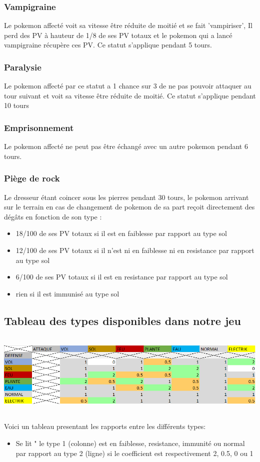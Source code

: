 		\subsubsection{Vampigraine}
            Le pokemon affecté voit sa vitesse être réduite de moitié et se fait 'vampiriser', Il perd des PV à hauteur de 1/8 de ses PV totaux et le pokemon qui a lancé vampigraine récupère ces PV. Ce statut s'applique pendant 5 tours.
		\subsubsection{Paralysie}
            Le pokemon affecté par ce statut a 1 chance sur 3 de ne pas pouvoir attaquer au tour suivant et voit sa vitesse être réduite de moitié. Ce statut s'applique pendant 10 tours
		\subsubsection{Emprisonnement}
            Le pokemon affecté ne peut pas être échangé avec un autre pokemon pendant 6 tours.
        \subsubsection{Piège de rock}
            Le dresseur étant coincer sous les pierres pendant 30 tours, le pokemon arrivant sur le terrain en cas de changement de pokemon de sa part reçoit directement des dégâts en fonction de son type :
            \begin{itemize}
                \item 18/100 de ses PV totaux si il est en faiblesse par rapport au type sol
                \item 12/100 de ses PV totaux si il n'est ni en faiblesse ni en resistance par rapport au type sol
                \item 6/100 de ses PV totaux si il est en resistance par rapport au type sol
                \item rien si il est immunisé au type sol
            \end{itemize}
    \subsection{Tableau des types disponibles dans notre jeu}
        \begin{center}
			\includegraphics[width=15cm,height=4cm]{images/tableau_type}
		\end{center}
        Voici un tableau presentant les rapports entre les différents types:
        \begin{itemize}
        \item Se lit " le type 1 (colonne) est en faiblesse, resistance, immunité ou normal par rapport au type 2 (ligne) si le coefficient est respectivement 2, 0.5, 0 ou 1
        \end{itemize}